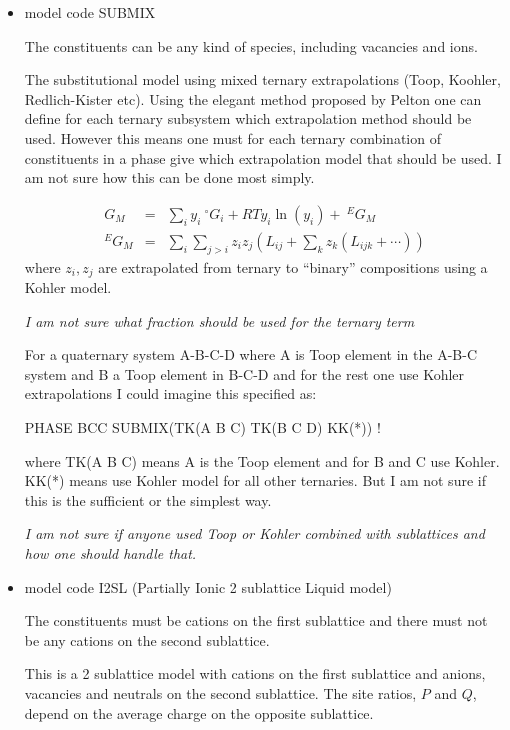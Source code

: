 \documentclass[12pt]{article}
\begin{document}
\begin{itemize}
  {\em I am not sure how to specify the independent binary variable
    and what fractions should be used for any ternary term}

\item model code SUBMIX

  The constituents can be any kind of species, including vacancies and
  ions.

  The substitutional model using mixed ternary extrapolations (Toop,
  Koohler, Redlich-Kister etc).  Using the elegant method proposed by
  Pelton\cite{01Pel} one can define for each ternary subsystem which
  extrapolation method should be used.  However this means one must
  for each ternary combination of constituents in a phase give which
  extrapolation model that should be used.  I am not sure how this can
  be done most simply.

  \begin{eqnarray}
    G_M &=& \sum_i y_i~^{\circ}G_i + RT y_i\ln(y_i) + ~^EG_M\\
    ^EG_M &=&\sum_i \sum_{j>i} z_i z_j (L_{ij} + \sum_k z_k (L_{ijk} + \cdots))
  \end{eqnarray}
  where $z_i, z_j$ are extrapolated from ternary to ``binary''
  compositions using a Kohler model.
  
  {\em I am not sure what fraction should be used for the ternary term
  
  For a quaternary system A-B-C-D where A is Toop element in the A-B-C
  system and B a Toop element in B-C-D and for the rest one use Kohler
  extrapolations I could imagine this specified as:
  
  PHASE BCC SUBMIX(TK(A B C) TK(B C D) KK(*)) !
  
  where TK(A B C) means A is the Toop element and for B and C use
  Kohler.  KK(*) means use Kohler model for all other ternaries.  But
  I am not sure if this is the sufficient or the simplest way.}

  {\em I am not sure if anyone used Toop or Kohler combined with
    sublattices and how one should handle that.}
  
\item model code I2SL (Partially Ionic 2 sublattice Liquid model)

  The constituents must be cations on the first sublattice and there
  must not be any cations on the second sublattice.

  This is a 2 sublattice model with cations on the first sublattice
  and anions, vacancies and neutrals on the second sublattice.  The
  site ratios, $P$ and $Q$, depend on the average charge on the
  opposite sublattice.


\end{itemize}
\end{document}
